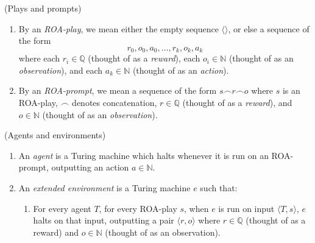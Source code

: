 \documentclass[runningheads]{llncs}
\begin{document}
\begin{definition}
(Plays and prompts)
    \begin{enumerate}
        \item
        By an \emph{ROA-play}, we mean either the empty sequence $\langle\rangle$,
        or else a sequence of the form
        \[
            r_0,o_0,a_0,\ldots,r_k,o_k,a_k
        \]
        where each $r_i\in\mathbb Q$ (thought of as a \emph{reward}),
        each $o_i\in\mathbb N$ (thought of as an \emph{observation}),
        and each $a_k\in \mathbb N$ (thought of as an \emph{action}).
        \item
        By an \emph{ROA-prompt}, we mean a sequence of the form
        $s\frown r\frown o$
        where $s$ is an ROA-play, $\frown$ denotes concatenation,
        $r\in\mathbb Q$ (thought of as a \emph{reward}),
        and $o\in\mathbb N$ (thought of as an \emph{observation}).
    \end{enumerate}
\end{definition}

\begin{definition}
\label{agentandenvironment}
(Agents and environments)
    \begin{enumerate}
    \item An \emph{agent} is a Turing machine which
    halts whenever it is run on an ROA-prompt, outputting
    an action $a\in\mathbb N$.
    \item An \emph{extended environment} is a Turing machine $e$ such that:
        \begin{enumerate}
            \item
            For every agent $T$, for every
            ROA-play $s$,
            when $e$ is run on input $\langle T,s\rangle$, $e$ halts on that input,
            outputting a pair $\langle r,o\rangle$ where $r\in\mathbb Q$ (thought of
            as a reward) and $o\in\mathbb N$ (thought of as an observation).
        \end{enumerate}
    \end{enumerate}
\end{definition}
\end{document}
